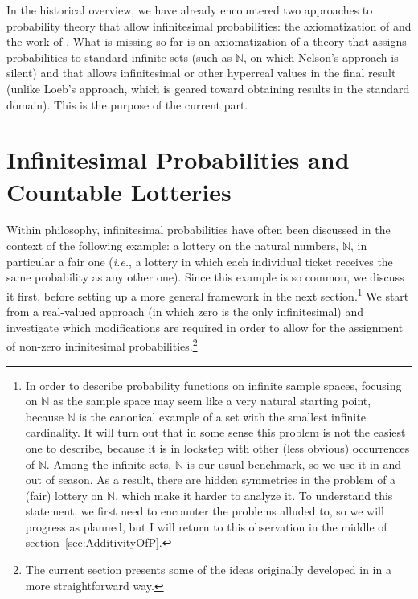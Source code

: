 
\noindent In the historical overview, we have already encountered two approaches to probability theory that allow infinitesimal probabilities: the axiomatization of \citet{Nelson:1987} and the work of \citet{Loeb:1975}. What is missing so far is an axiomatization of a theory that assigns probabilities to standard infinite sets (such as $\mathbb{N}$, on which Nelson's approach is silent) and that allows infinitesimal or other hyperreal values in the final result (unlike Loeb's approach, which is geared toward obtaining results in the standard domain). This is the purpose of the current part.

\section{Infinitesimal Probabilities and Countable Lotteries}\label{sec:natural}
Within philosophy, infinitesimal probabilities have often been discussed in the context of the following example: a lottery on the natural numbers, $\mathbb{N}$, in particular a fair one (\textit{i.e.}, a lottery in which each individual ticket receives the same probability as any other one). Since this example is so common, we discuss it first, before setting up a more general framework in the next section.\footnote{In order to describe probability functions on infinite sample spaces, focusing on $\mathbb{N}$ as the sample space may seem like a very natural starting point, because $\mathbb{N}$ is the canonical example of a set with the smallest infinite cardinality.
It will turn out that in some sense this problem is not the easiest one to describe, because it is in lockstep with other (less obvious) occurrences of $\mathbb{N}$. Among the infinite sets, $\mathbb{N}$ is our usual benchmark, so we use it in and out of season. As a result, there are hidden symmetries in the problem of a (fair) lottery on $\mathbb{N}$, which make it harder to analyze it. To understand this statement, we first need to encounter the problems alluded to, so we will progress as planned, but I will return to this observation in the middle of section~\ref{sec:AdditivityOfP}.}
We start from a real-valued approach (in which zero is the only infinitesimal) and investigate which modifications are required in order to allow for the assignment of non-zero infinitesimal probabilities.\footnote{The current section presents some of the ideas originally developed in \citet{WenmackersHorsten:2013} in a more straightforward way.}


